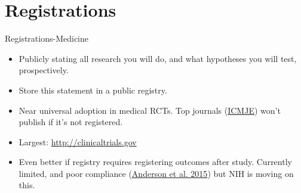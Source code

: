 \documentclass{beamer}
\begin{document}
\section*{Registrations}
\begin{frame}{Registrations-Medicine}
 \begin{itemize}
  \item
   Publicly stating all research you will do, and what hypotheses you will test, prospectively.
  \item Store this statement in a public registry.
  \item
   Near universal adoption in medical RCTs. Top journals (\href{http://www.nejm.org/doi/full/10.1056/NEJMe048225}{ICMJE}) won't publish if it's not registered.
   \item Largest: \url{http://clinicaltrials.gov}
  \item
   Even better if registry requires registering outcomes after study. Currently limited, and poor compliance (\href{http://www.nejm.org/doi/full/10.1056/NEJMsa1409364}{Anderson et al. 2015}) but NIH is moving on this. \href{http://www.nih.gov/news/health/nov2014/od-19.htm}{}
\end{itemize}
\end{frame}
\end{document}
